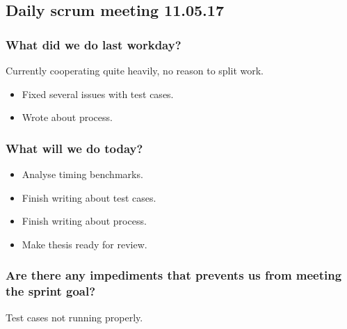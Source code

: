 \documentclass{article}
\begin{document}
\begin{center}
\subsection*{Daily scrum meeting 11.05.17}
\end{center}
\bigskip


\subsubsection*{What did we do last workday?}
Currently cooperating quite heavily, no reason to
split work.

\begin{itemize}
	\item
	Fixed several issues with test cases.

	\item
	Wrote about process.
\end{itemize}

\subsubsection*{What will we do today?}
\begin{itemize}
    \item
    Analyse timing benchmarks.

    \item
    Finish writing about test cases.

    \item
    Finish writing about process.

    \item
    Make thesis ready for review.
\end{itemize}

\subsubsection*{Are there any impediments that prevents us from meeting the sprint goal?}
Test cases not running properly.
\end{document}

